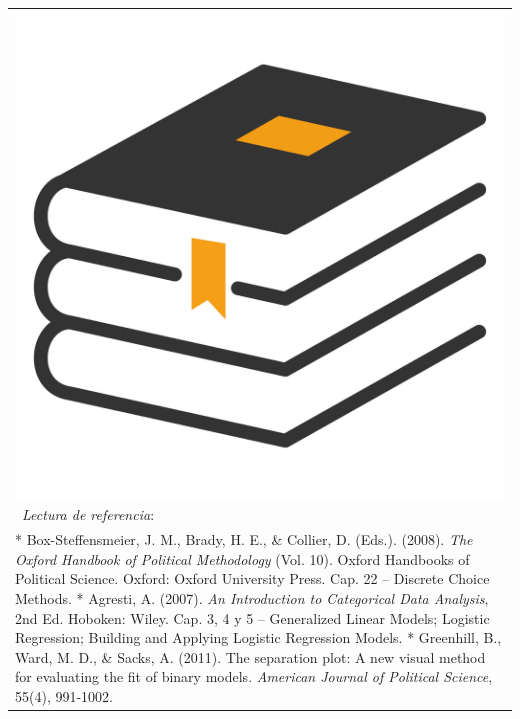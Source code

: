 \documentclass[]{book}
\begin{document}
\begin{longtable}[]{@{}l@{}}
\toprule
\begin{minipage}[t]{0.86\columnwidth}\raggedright\strut
\includegraphics{00-images/book.png}~\emph{Lectura de referencia}:\strut
\end{minipage}\tabularnewline
\begin{minipage}[t]{0.86\columnwidth}\raggedright\strut
* Box-Steffensmeier, J. M., Brady, H. E., \& Collier, D. (Eds.). (2008).
\emph{The Oxford Handbook of Political Methodology} (Vol. 10). Oxford
Handbooks of Political Science. Oxford: Oxford University Press. Cap. 22
-- Discrete Choice Methods. * Agresti, A. (2007). \emph{An Introduction
to Categorical Data Analysis}, 2nd Ed. Hoboken: Wiley. Cap. 3, 4 y 5 --
Generalized Linear Models; Logistic Regression; Building and Applying
Logistic Regression Models. * Greenhill, B., Ward, M. D., \& Sacks, A.
(2011). The separation plot: A new visual method for evaluating the fit
of binary models. \emph{American Journal of Political Science}, 55(4),
991-1002.\strut
\end{minipage}\tabularnewline
\bottomrule
\end{longtable}
\end{document}
